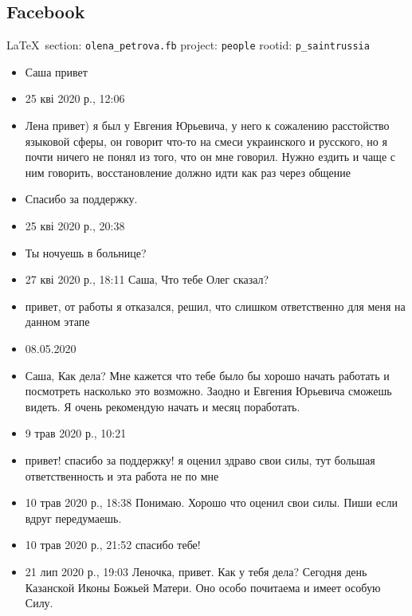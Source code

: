  
 
\subsection{Facebook}
  
\vspace{0.5cm}
 {\ifDEBUG\small\LaTeX~section: \verb|olena_petrova.fb| project: \verb|people| rootid: \verb|p_saintrussia| \fi}
\vspace{0.5cm}
  
\begin{itemize}
\item Саша привет
\item 25 кві 2020 р., 12:06
\item Лена привет) я был у Евгения Юрьевича, у него к сожалению расстойство
        языковой сферы, он говорит что-то на смеси украинского и русского, но я
        почти ничего не понял из того, что он мне говорил. Нужно ездить и чаще
        с ним говорить, восстановление должно идти как раз через общение
\item Спасибо за поддержку.
\item 25 кві 2020 р., 20:38
\item Ты ночуешь в больнице?
\item 27 кві 2020 р., 18:11
Саша, Что тебе Олег сказал?
\item привет, от работы я отказался, решил, что слишком ответственно для меня на данном этапе
\item 08.05.2020
\item Саша,
Как дела?  Мне кажется что тебе было бы хорошо начать работать и посмотреть
                насколько это возможно. Заодно и Евгения Юрьевича сможешь
                видеть. Я очень рекомендую начать и месяц поработать.
\item 9 трав 2020 р., 10:21
\item привет! спасибо за поддержку! я оценил здраво свои силы, тут большая ответственность и эта работа не по мне
\item 10 трав 2020 р., 18:38 Понимаю. Хорошо что оценил свои силы. Пиши если
        вдруг передумаешь.
\item 10 трав 2020 р., 21:52
спасибо тебе!
\item 21 лип 2020 р., 19:03 Леночка, привет. Как у тебя дела? Сегодня день
        Казанской Иконы Божьей Матери. Оно особо почитаема и имеет особую Силу.

\end{itemize}
